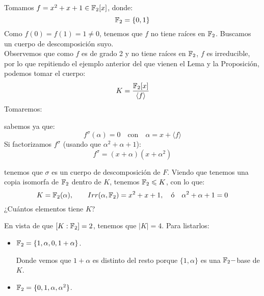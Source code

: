 \begin{ejemplo}
    Tomamos $f = x^2+x+1\in \mathbb{F}_2[x]$, donde:
    \begin{equation*}
        \mathbb{F}_2 = \{0,1\}
    \end{equation*}
    Como $f(0) = f(1) = 1 \neq 0$, tenemos que $f$ no tiene raíces en $\mathbb{F}_2$. Buscamos un cuerpo de descomposición suyo.\\

    \noindent
    Observemos que como $f$ es de grado 2 y no tiene raíces en $\mathbb{F}_2$, $f$ es irreducible, por lo que repitiendo el ejemplo anterior del que vienen el Lema y la Proposición, podemos tomar el cuerpo:
    \begin{equation*}
        K = \dfrac{\mathbb{F}_2[x]}{\langle f \rangle }
    \end{equation*}
    Tomaremos: 

    sabemos ya que:
    \begin{equation*}
        f^\sigma(\alpha) = 0 \quad \text{con}\quad  \alpha = x+\langle f \rangle 
    \end{equation*}
    Si factorizamos $f^\sigma$ (usando que $\alpha^2 + \alpha+1$):
    \begin{equation*}
        f^\sigma = (x+\alpha)(x+\alpha^2)
    \end{equation*}

    tenemos que $\sigma$ es un cuerpo de descomposición de $F$. Viendo que tenemos una copia isomorfa de $\mathbb{F}_2$ dentro de $K$, tenemos $\mathbb{F}_2\leqslant K$, con lo que:
    \begin{equation*}
        K = \mathbb{F}_2(\alpha), \qquad Irr(\alpha,\mathbb{F}_2) = x^2+x+1, \quad \text{ó}\quad \alpha^2 + \alpha+1=0
    \end{equation*}
    ¿Cuántos elementos tiene $K$?

    \noindent
    En vista de que $[K:\mathbb{F}_2] = 2$, tenemos que $|K| = 4$. Para listarlos:
    \begin{itemize}
        \item $\mathbb{F}_2 = \{1,\alpha,0,1+\alpha\}$. 

            Donde vemos que $1+\alpha$ es distinto del resto porque $\{1,\alpha\}$ es una $\mathbb{F}_2-$base de $K$.
        \item $\mathbb{F}_2 = \{0,1,\alpha,\alpha^2\}$.
    \end{itemize}
\end{ejemplo}

